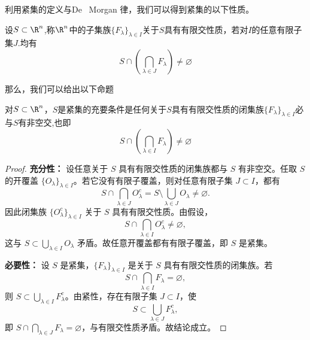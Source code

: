 利用紧集的定义与De ~Morgan 律，我们可以得到紧集的以下性质。
\begin{definition}
	设$S\subset \R^n$,称$\R^n$中的子集族$\{F_{\lambda}\}_{\lambda\in I}$关于$S$具有有限交性质，若对$I$的任意有限子集$J$.均有
	\[S\cap(\bigcap_{\lambda\in J}F_{\lambda})\neq \varnothing\]
\end{definition}
那么，我们可以给出以下命题
\begin{proposition}
	对$S\subset \R^n$，$S$是紧集的充要条件是任何关于$S$具有有限交性质的闭集族$\{F_{\lambda}\}_{\lambda\in I}$必与$S$有非空交,也即
	\[S\cap(\bigcap_{\lambda\in I}F_{\lambda})\neq \varnothing\]
\end{proposition}
\begin{proof}
\textbf{充分性：} 设任意关于 $S$ 具有有限交性质的闭集族都与 $S$ 有非空交。任取 $S$ 的开覆盖 $\{O_\lambda\}_{\lambda\in I}$。若它没有有限子覆盖，则对任意有限子集 $J\subset I$，都有
\[
S\cap\bigcap_{\lambda\in J}O_\lambda^c
=S\setminus\bigcup_{\lambda\in J}O_\lambda\neq\varnothing.
\]
因此闭集族 $\{O_\lambda^c\}_{\lambda\in I}$ 关于 $S$ 具有有限交性质。由假设，
\[
S\cap\bigcap_{\lambda\in I}O_\lambda^c\neq\varnothing,
\]
这与 $S\subset\bigcup_{\lambda\in I}O_\lambda$ 矛盾。故任意开覆盖都有有限子覆盖，即 $S$ 是紧集。

\textbf{必要性：} 设 $S$ 是紧集，$\{F_\lambda\}_{\lambda\in I}$ 是关于 $S$ 具有有限交性质的闭集族。若
\[
S\cap\bigcap_{\lambda\in I}F_\lambda=\varnothing,
\]
则 $S\subset\bigcup_{\lambda\in I}F_\lambda^c$。由紧性，存在有限子集 $J\subset I$，使
\[
S\subset\bigcup_{\lambda\in J}F_\lambda^c,
\]
即 $S\cap\bigcap_{\lambda\in J}F_\lambda=\varnothing$，与有限交性质矛盾。故结论成立。
\end{proof}
